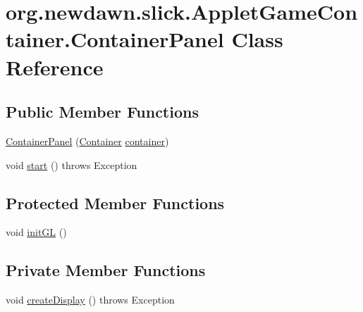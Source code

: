 \hypertarget{classorg_1_1newdawn_1_1slick_1_1_applet_game_container_1_1_container_panel}{}\section{org.\+newdawn.\+slick.\+Applet\+Game\+Container.\+Container\+Panel Class Reference}
\label{classorg_1_1newdawn_1_1slick_1_1_applet_game_container_1_1_container_panel}
\subsection*{Public Member Functions}
\begin{DoxyCompactItemize}
\item 
\mbox{\hyperlink{classorg_1_1newdawn_1_1slick_1_1_applet_game_container_1_1_container_panel_a71e98bdd07081b033755c98b0183c7f4}{Container\+Panel}} (\mbox{\hyperlink{classorg_1_1newdawn_1_1slick_1_1_applet_game_container_1_1_container}{Container}} \mbox{\hyperlink{classorg_1_1newdawn_1_1slick_1_1_applet_game_container_1_1_container_panel_a205433c30651024b8b0ba19894a080f6}{container}})
\item 
void \mbox{\hyperlink{classorg_1_1newdawn_1_1slick_1_1_applet_game_container_1_1_container_panel_af7a71499be1ee871ac8ec833a3cbec90}{start}} ()  throws Exception 
\end{DoxyCompactItemize}
\subsection*{Protected Member Functions}
\begin{DoxyCompactItemize}
\item 
void \mbox{\hyperlink{classorg_1_1newdawn_1_1slick_1_1_applet_game_container_1_1_container_panel_a4b658282611744354185e5adef954b53}{init\+GL}} ()
\end{DoxyCompactItemize}
\subsection*{Private Member Functions}
\begin{DoxyCompactItemize}
\item 
void \mbox{\hyperlink{classorg_1_1newdawn_1_1slick_1_1_applet_game_container_1_1_container_panel_a4b7aa4a0a37d31b1391e1d254fe0e693}{create\+Display}} ()  throws Exception 
\end{DoxyCompactItemize}
